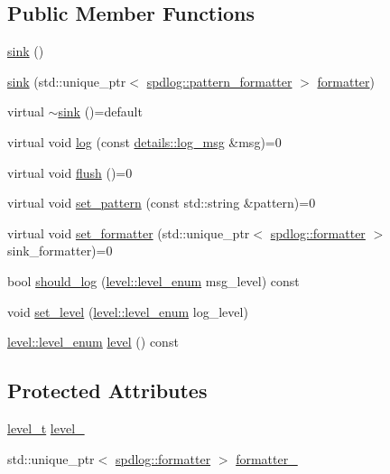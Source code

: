 \subsection*{Public Member Functions}
\begin{DoxyCompactItemize}
\item 
\hyperlink{classspdlog_1_1sinks_1_1sink_a9fc419b02a5b7bd279da42f04f6979ab}{sink} ()
\item 
\hyperlink{classspdlog_1_1sinks_1_1sink_a8523cd526092feffd549cf7a8b5f38fe}{sink} (std\+::unique\+\_\+ptr$<$ \hyperlink{classspdlog_1_1pattern__formatter}{spdlog\+::pattern\+\_\+formatter} $>$ \hyperlink{classspdlog_1_1formatter}{formatter})
\item 
virtual \hyperlink{classspdlog_1_1sinks_1_1sink_a2637af0973ac863eedd76ee683279c0b}{$\sim$sink} ()=default
\item 
virtual void \hyperlink{classspdlog_1_1sinks_1_1sink_a51d8f34ad79064e0dc13c6013236e427}{log} (const \hyperlink{structspdlog_1_1details_1_1log__msg}{details\+::log\+\_\+msg} \&msg)=0
\item 
virtual void \hyperlink{classspdlog_1_1sinks_1_1sink_a8a0674ae3bca8f1617aef820e23a2ccd}{flush} ()=0
\item 
virtual void \hyperlink{classspdlog_1_1sinks_1_1sink_a7e5cfd4b683c8bfa8fbd602d7f409632}{set\+\_\+pattern} (const std\+::string \&pattern)=0
\item 
virtual void \hyperlink{classspdlog_1_1sinks_1_1sink_ac410f2229e583a75337a5fdf45d020be}{set\+\_\+formatter} (std\+::unique\+\_\+ptr$<$ \hyperlink{classspdlog_1_1formatter}{spdlog\+::formatter} $>$ sink\+\_\+formatter)=0
\item 
bool \hyperlink{classspdlog_1_1sinks_1_1sink_a1c932f19f67057fbe7518999bdd5c422}{should\+\_\+log} (\hyperlink{namespacespdlog_1_1level_a35f5227e5daf228d28a207b7b2aefc8b}{level\+::level\+\_\+enum} msg\+\_\+level) const
\item 
void \hyperlink{classspdlog_1_1sinks_1_1sink_a038a91409395dca18a7ccca81622fd83}{set\+\_\+level} (\hyperlink{namespacespdlog_1_1level_a35f5227e5daf228d28a207b7b2aefc8b}{level\+::level\+\_\+enum} log\+\_\+level)
\item 
\hyperlink{namespacespdlog_1_1level_a35f5227e5daf228d28a207b7b2aefc8b}{level\+::level\+\_\+enum} \hyperlink{classspdlog_1_1sinks_1_1sink_ae59ca2b418c5cdfed1c04e49a444be1c}{level} () const
\end{DoxyCompactItemize}
\subsection*{Protected Attributes}
\begin{DoxyCompactItemize}
\item 
\hyperlink{namespacespdlog_a8585bf495310a6ce695191739351709b}{level\+\_\+t} \hyperlink{classspdlog_1_1sinks_1_1sink_a435da07b59e1165b38d53635cdada30a}{level\+\_\+}
\item 
std\+::unique\+\_\+ptr$<$ \hyperlink{classspdlog_1_1formatter}{spdlog\+::formatter} $>$ \hyperlink{classspdlog_1_1sinks_1_1sink_aa0d19f09363a11b63b4a9b1d46f8a4b3}{formatter\+\_\+}
\end{DoxyCompactItemize}


